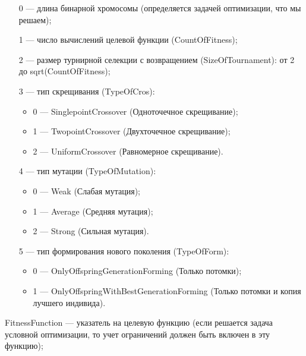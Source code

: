 \documentclass[a4paper,12pt]{article}
\begin{document}
 \begin{itemize}
 \item [0] --- длина бинарной хромосомы (определяется задачей оптимизации, что мы решаем);
 
 \item [1] --- число вычислений целевой функции (CountOfFitness);
 
 \item [2] --- размер турнирной селекции с возвращением (SizeOfTournament): от 2 до sqrt(CountOfFitness);
 
 \item [3] --- тип скрещивания (TypeOfCros):
  \begin{itemize}
       \item 0 --- SinglepointCrossover (Одноточечное скрещивание);
 
       \item 1 --- TwopointCrossover (Двухточечное скрещивание);
 
       \item 2 --- UniformCrossover (Равномерное скрещивание).
	    \end{itemize}
 
 \item [4] --- тип мутации (TypeOfMutation):
  \begin{itemize}
       \item 0 --- Weak (Слабая мутация);
 
       \item 1 --- Average (Средняя мутация);
 
       \item 2 --- Strong (Сильная мутация).
	    \end{itemize}
 
 \item [5] --- тип формирования нового поколения (TypeOfForm):
  \begin{itemize}
       \item 0 --- OnlyOffspringGenerationForming (Только потомки);
 
       \item 1 --- OnlyOffspringWithBestGenerationForming (Только потомки и копия лучшего индивида).
	    \end{itemize}
		
 \end{itemize}
 
FitnessFunction --- указатель на целевую функцию (если решается задача условной оптимизации, то учет ограничений должен быть включен в эту функцию);
 
\end{document}
